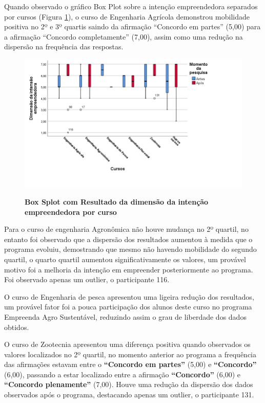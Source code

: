 Quando observado o gráfico Box Plot sobre a intenção empreendedora separados por cursos (Figura \ref{figura_boxplot_intencao}), o curso de Engenharia Agrícola demonstrou mobilidade positiva no 2º e 3º quartis saindo da afirmação “Concordo em partes” (5,00) para a afirmação “Concordo completamente” (7,00), assim como uma redução na dispersão na frequência das respostas.


\begin{figure}[H]
\centering
\caption{\textbf{Box Splot com Resultado da dimensão da intenção empreendedora por curso}}
\includegraphics[scale=0.7]{Imagens/boxplot_intencao_empreendedora.png}
\label{figura_boxplot_intencao}
\end{figure}


Para o curso de engenharia Agronômica não houve mudança no 2º quartil, no entanto foi observado que a dispersão dos resultados aumentou à medida que o programa evoluiu, demostrando que mesmo não havendo mobilidade do segundo quartil, o quarto quartil aumentou significativamente os valores, um provável motivo foi a melhoria da intenção em empreender posteriormente ao programa. Foi observado apenas um outlier, o participante 116.

O curso de Engenharia de pesca apresentou uma ligeira redução dos resultados, um provável fator foi a pouca participação dos alunos deste curso no programa Empreenda Agro Sustentável, reduzindo assim o grau de liberdade dos dados obtidos.  

O curso de Zootecnia apresentou uma diferença positiva quando observados os valores localizados no 2º quartil, no momento anterior ao programa a frequência das afirmações estavam entre o \textbf{“Concordo em partes”} (5,00) e \textbf{“Concordo”} (6,00), passando a estar localizado entre a afirmação \textbf{“Concordo”} (6,00) e \textbf{“Concordo plenamente”} (7,00). Houve uma redução da dispersão dos dados observados após o programa, destacando apenas um outlier, o participante 131. 

